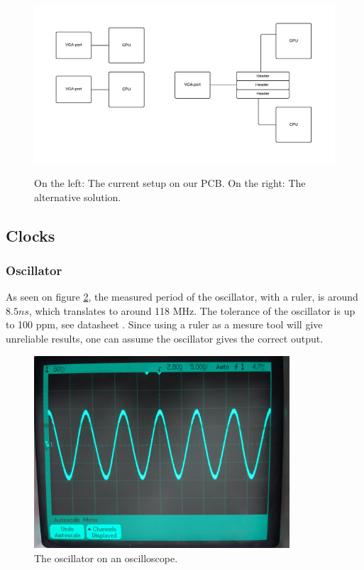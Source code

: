 \documentclass[../main/report.tex]{subfiles}
\begin{document}
\begin{figure}[H]
    \centering
    \includegraphics[width=\textwidth]{../discussion/assets/vga-solution.pdf}
    \label{fig:vga-solution}
    \caption{On the left: The current setup on our PCB. On the right: The alternative solution.}
\end{figure}

\subsection{Clocks}

\subsubsection*{Oscillator}

As seen on figure \ref{fig:oscillator-scope}, the measured period of the oscillator, with a ruler, is around $8.5 ns$, which translates to around 118 MHz.
The tolerance of the oscillator is up to 100 ppm, see datasheet \cite{xpresso-oscillator}.
Since using a ruler as a mesure tool will give unreliable results, one can assume the oscillator gives the correct output.
\begin{figure}[H]
		\centering
		\includegraphics[width=0.85\textwidth]{../discussion/assets/oscillator.jpg}
		\caption{The oscillator on an oscilloscope.}
		\label{fig:oscillator-scope}
\end{figure}
\end{document}
